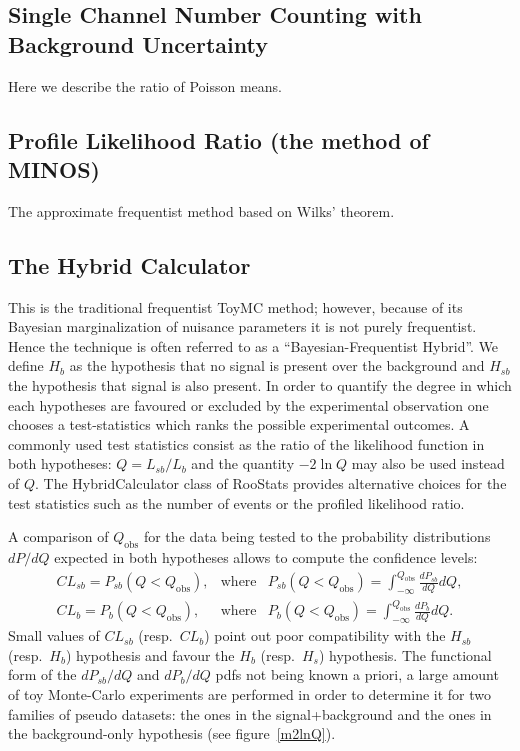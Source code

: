 \documentclass[11pt]{article}
\begin{document}
	\subsection{Single Channel Number Counting with Background Uncertainty}

Here we describe the ratio of Poisson means.

	\subsection{Profile Likelihood Ratio (the method of MINOS)}

The approximate frequentist method based on Wilks' theorem.





	\subsection{The Hybrid Calculator}

This is the traditional frequentist ToyMC method; however, because of
its Bayesian marginalization of nuisance parameters it is not purely
frequentist.  Hence the technique is often referred to as a
``Bayesian-Frequentist Hybrid''.
 We define $H_b$ as the hypothesis that no signal is
present over the background and $H_{sb}$ the hypothesis that signal is
also present. In order to quantify the degree in which each hypotheses
are favoured or excluded by the experimental observation one chooses a
test-statistics which ranks the possible experimental outcomes. A
commonly used test statistics consist as the ratio of the likelihood
function in both hypotheses: $Q=L_{sb}/L_b$ and the quantity $-2\ln Q$
may also be used instead of $Q$. The HybridCalculator class of RooStats provides alternative
choices for the test statistics such as the number of events or the
profiled likelihood ratio.


A comparison of $Q_\mathrm{obs}$ for the data being tested to the
probability distributions $dP/dQ$ expected in both hypotheses allows
to compute the confidence levels:
\begin{eqnarray}
  CL_{sb} = P_{sb}(Q<Q_\mathrm{obs}), & \mathrm{where} & P_{sb}(Q<Q_\mathrm{obs}) = \int_{-\infty}^{Q_\mathrm{obs}}\frac{dP_{sb}}{dQ} dQ, \\
  CL_{b} = P_{b}(Q<Q_\mathrm{obs}), & \mathrm{where} & P_{b}(Q<Q_\mathrm{obs}) = \int_{-\infty}^{Q_\mathrm{obs}}\frac{dP_{b}}{dQ} dQ.
\end{eqnarray}
Small values of $CL_{sb}$ (resp.~$CL_{b}$) point out poor compatibility with the $H_{sb}$ (resp.~$H_{b}$)
hypothesis and favour the $H_{b}$ (resp.~$H_{s}$) hypothesis.
The functional form of the $dP_{sb}/dQ$ and $dP_{b}/dQ$ pdfs not being
known a priori, a large amount of toy Monte-Carlo experiments are performed
in order to determine it for
two families of pseudo datasets: the ones in the signal+background and the ones in 
the background-only hypothesis (see figure~\ref{m2lnQ}).
\end{document}
